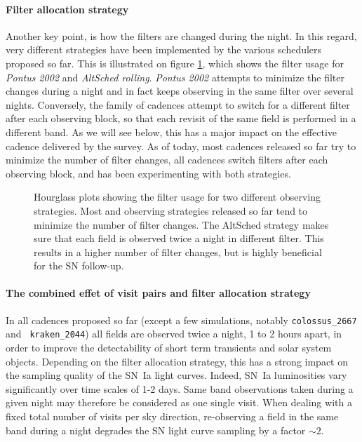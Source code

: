\paragraph{Filter allocation strategy} Another key point, is how the filters are
changed during the night.  In this regard, very different strategies
have been implemented by the various schedulers proposed so far.  This
is illustrated on figure \ref{fig:hourglass_plot_filter_alloc}, which
shows the filter usage for  {\em Pontus 2002} and {\em
  AltSched rolling}.  {\em Pontus 2002} attempts to minimize the
filter changes during a night and in fact keeps observing in the same
filter over several nights.  Conversely, the \altsched family of
cadences attempt to switch for a different filter after each observing
block, so that each revisit of the same field is performed in a
different band.  As we will see below, this has a major impact on the effective cadence
delivered by the survey. As of today, most \opsim cadences released so
far try to minimize the number of filter changes, all \altsched cadences
switch filters after each observing block, and \slair has been
experimenting with both strategies.

\begin{figure}
  \begin{center}
    \caption{Hourglass plots showing the filter usage for two
      different observing strategies. Most \opsim and \slair observing
      strategies released so far tend to minimize the number of filter
      changes. The AltSched strategy makes sure that each field is
      observed twice a night in different filter. This results in a
      higher number of filter changes, but is highly beneficial for
      the SN follow-up. }
    \label{fig:hourglass_plot_filter_alloc}
  \end{center}
\end{figure}

\paragraph{The combined effet of visit pairs and filter allocation strategy} In all cadences proposed so far
(except a few simulations, notably {\tt colossus\_2667} and {\tt
  kraken\_2044}) all fields are observed twice a night, 1 to 2 hours
apart, in order to improve the detectability of short term transients
and solar system objects.  Depending on the filter allocation
strategy, this has a strong impact on the sampling quality of the
SN~Ia light curves.  Indeed, SN~Ia luminosities vary significantly
over time scales of 1-2 days.  Same band observations taken during a
given night may therefore be considered as one single visit. When
dealing with a fixed total number of visits per sky direction,
re-observing a field in the same band during a night degrades the SN
light curve sampling by a factor $\sim 2$.

